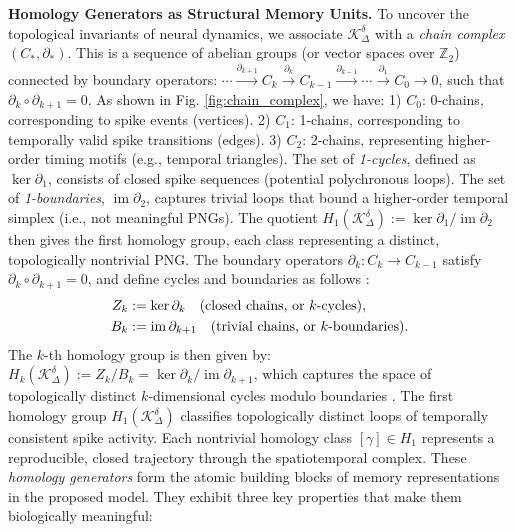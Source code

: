 \documentclass[lettersize,journal]{IEEEtran}
\begin{document}
\noindent\textbf{Homology Generators as Structural Memory Units.}
To uncover the topological invariants of neural dynamics, we associate \( \mathcal{K}_\Delta^\delta \) with a \emph{chain complex} \( (C_*, \partial_*) \). This is a sequence of abelian groups (or vector spaces over \( \mathbb{Z}_2 \)) connected by boundary operators:
$\cdots \xrightarrow{\partial_{k+1}} C_k \xrightarrow{\partial_k} C_{k-1} \xrightarrow{\partial_{k-1}} \cdots \xrightarrow{\partial_1} C_0 \to 0$,
such that \( \partial_k \circ \partial_{k+1} = 0 \). As shown in Fig. \ref{fig:chain_complex}, we have:
1) \textbf{\( C_0 \)}: 0-chains, corresponding to spike events (vertices).
2) \textbf{\( C_1 \)}: 1-chains, corresponding to temporally valid spike transitions (edges).
3) \textbf{\( C_2 \)}: 2-chains, representing higher-order timing motifs (e.g., temporal triangles).
The set of \emph{1-cycles}, defined as \( \ker \partial_1 \), consists of closed spike sequences (potential polychronous loops). The set of \emph{1-boundaries}, \( \operatorname{im} \partial_2 \), captures trivial loops that bound a higher-order temporal simplex (i.e., not meaningful PNGs). The quotient
$H_1(\mathcal{K}_\Delta^\delta) := \ker \partial_1 / \operatorname{im} \partial_2$
then gives the first homology group, each class representing a distinct, topologically nontrivial PNG.
The boundary operators \( \partial_k: C_k \rightarrow C_{k-1} \) satisfy \( \partial_k \circ \partial_{k+1} = 0 \), and define cycles and boundaries as follows \cite{bredon2013topology}:
\begin{align}
    Z_k &:= \ker \partial_k \quad \text{(closed chains, or \( k \)-cycles)}, \\
    B_k &:= \operatorname{im} \partial_{k+1} \quad \text{(trivial chains, or \( k \)-boundaries)}.
\end{align}
The \( k \)-th homology group is then given by:
$H_k(\mathcal{K}_\Delta^\delta) := Z_k / B_k = \ker \partial_k / \operatorname{im} \partial_{k+1}$,
which captures the space of topologically distinct \( k \)-dimensional cycles modulo boundaries \cite{spanier2012algebraic}.
The first homology group \( H_1(\mathcal{K}_\Delta^\delta) \) classifies topologically distinct loops of temporally consistent spike activity. Each nontrivial homology class \( [\gamma] \in H_1 \) represents a reproducible, closed trajectory through the spatiotemporal complex. 
These \emph{homology generators} form the atomic building blocks of memory representations in the proposed model. They exhibit three key properties that make them biologically meaningful:
\end{document}
